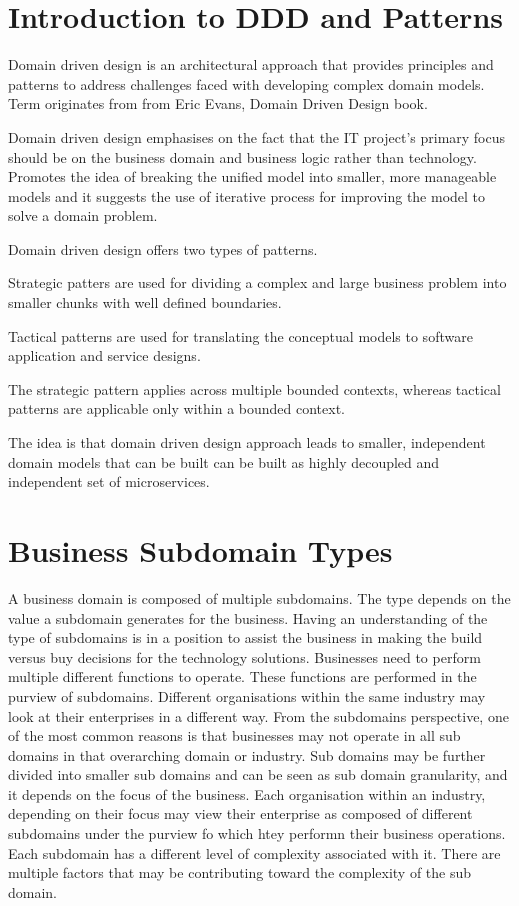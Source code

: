 \documentclass[a4paper, 11pt]{book}
\begin{document}
    \section{Introduction to DDD and Patterns}
    Domain driven design is an architectural approach that provides principles and patterns to address challenges faced with developing complex domain models.
    Term originates from from Eric Evans, Domain Driven Design book.

    Domain driven design emphasises on the fact that the IT project's primary focus should be on the business domain and business logic rather than technology.
    Promotes the idea of breaking the unified model into smaller, more manageable models and it suggests the use of iterative process for improving the model to solve a domain problem.

    Domain driven design offers two types of patterns.

    Strategic patters are used for dividing a complex and large business problem into smaller chunks with well defined boundaries.

    Tactical patterns are used for translating the conceptual models to software application and service designs.

    The strategic pattern applies across multiple bounded contexts, whereas tactical patterns are applicable only within a bounded context.

    The idea is that domain driven design approach leads to smaller, independent domain models that can be built can be built as highly decoupled and independent set of microservices.


    \section{Business Subdomain Types}
    A business domain is composed of multiple subdomains.
    The type depends on the value a subdomain generates for the business.
    Having an understanding of the type of subdomains is in a position to assist the business in making the build versus buy decisions for the technology solutions.
    Businesses need to perform multiple different functions to operate.
    These functions are performed in the purview of subdomains.
    Different organisations within the same industry may look at their enterprises in a different way.
    From the subdomains perspective, one of the most common reasons is that businesses may not operate in all sub domains in that overarching domain or industry.
    Sub domains may be further divided into smaller sub domains and can be seen as sub domain granularity, and it depends on the focus of the business.
    Each organisation within an industry, depending on their focus may view their enterprise as composed of different subdomains under the purview fo which htey performn their business operations.
    Each subdomain has a different level of complexity associated with it.
    There are multiple factors that may be contributing toward the complexity of the sub domain.
\end{document}
